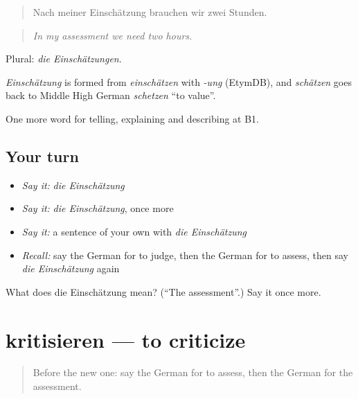 \begin{quote}
Nach meiner Einschätzung brauchen wir zwei Stunden.
\end{quote}

\begin{quote}
\emph{In my assessment we need two hours.}
\end{quote}

Plural: \emph{die Einschätzungen}.

\begin{cousinweb}
\emph{Einschätzung} is formed from \emph{einschätzen} with \emph{-ung} (EtymDB), and \emph{schätzen} goes back to Middle High German \emph{schetzen} \textquotedblleft{}to value\textquotedblright{}.
\end{cousinweb}

\begin{grammarlens}[title={What you've built}]
One more word for telling, explaining and describing at B1.
\end{grammarlens}

\subsection*{Your turn}
\begin{itemize}
\raggedright
  \item \emph{Say it:} \emph{die Einschätzung}
  \item \emph{Say it:} \emph{die Einschätzung}, once more
  \item \emph{Say it:} a sentence of your own with \emph{die Einschätzung}
  \item \emph{Recall:} say the German for to judge, then the German for to assess, then say \emph{die Einschätzung} again
\end{itemize}

\begin{tcolorbox}[breakable,colback=teal!4,colframe=teal!35!black,title={Before you move on}]
What does die Einschätzung mean? (\textquotedblleft{}The assessment\textquotedblright{}.) Say it once more.
\end{tcolorbox}
\section[kritisieren]{kritisieren — to criticize}

\label{lesson:GE-C340-kritisieren}



\begin{quote}
Before the new one: say the German for to assess, then the German for the assessment.
\end{quote}

